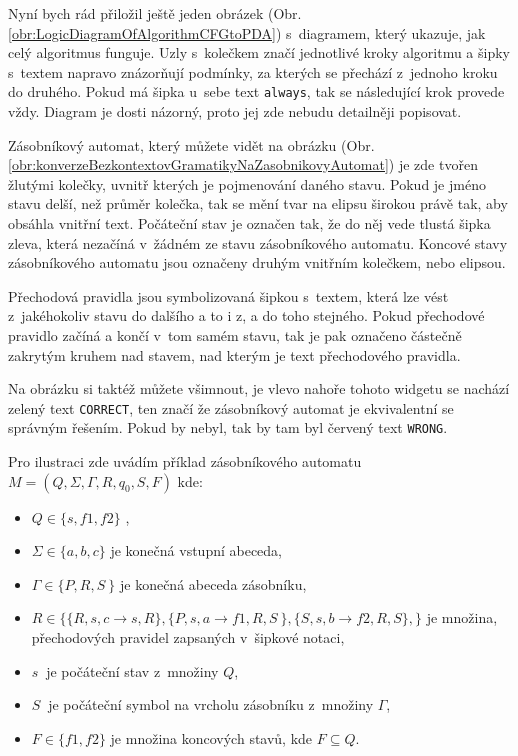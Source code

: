 Nyní bych rád přiložil ještě jeden obrázek (Obr. \ref{obr:LogicDiagramOfAlgorithmCFGtoPDA}) s~diagramem, který ukazuje, jak celý algoritmus funguje. Uzly s~kolečkem značí jednotlivé kroky algoritmu a šipky s~textem napravo znázorňují podmínky, za kterých se přechází z~jednoho kroku do druhého. Pokud má šipka u~sebe text \texttt{always}, tak se následující krok provede vždy. Diagram je dosti názorný, proto jej zde nebudu detailněji popisovat.



Zásobníkový automat, který můžete vidět na obrázku (Obr. \ref{obr:konverzeBezkontextovGramatikyNaZasobnikovyAutomat}) je zde tvořen žlutými kolečky, uvnitř kterých je pojmenování daného stavu. Pokud je jméno stavu delší, než průměr kolečka, tak se mění tvar na elipsu širokou právě tak, aby obsáhla vnitřní text. Počáteční stav je označen tak, že do něj vede tlustá šipka zleva, která nezačíná v~žádném ze stavu zásobníkového automatu. Koncové stavy zásobníkového automatu jsou označeny druhým vnitřním kolečkem, nebo elipsou.

Přechodová pravidla jsou symbolizovaná šipkou s~textem, která lze vést z~jakéhokoliv stavu do dalšího a to i z, a do toho stejného. Pokud přechodové pravidlo začíná a končí v~tom samém stavu, tak je pak označeno částečně zakrytým kruhem nad stavem, nad kterým je text přechodového pravidla. 

Na obrázku si taktéž můžete všimnout, je vlevo nahoře tohoto widgetu se nachází zelený text \texttt{CORRECT}, ten značí že zásobníkový automat je ekvivalentní se správným řešením. Pokud by nebyl, tak by tam byl červený text \texttt{WRONG}. 

Pro ilustraci zde uvádím příklad zásobníkového automatu \( M = (Q, \Sigma, \Gamma, R, q_0, S, F) \) kde:
\begin{itemize}
\item \( Q \in \{ s, f1, f2 \} \) ,
\item \( \Sigma \in \{ a, b, c \} \) je konečná vstupní abeceda,
\item \( \Gamma \in \{ P, R, S~\} \) je konečná abeceda zásobníku,
\item \( R \in \{ \{ R, s, c \rightarrow s, R \}, \{ P,s,a \rightarrow f1, R, S~\}, \{ S, s, b \rightarrow f2, R, S\}, \} \) je množina, přechodových pravidel zapsaných v~šipkové notaci,
\item \( s~\) je počáteční stav z~množiny \( Q \),
\item \( S~\) je počáteční symbol na vrcholu zásobníku z~množiny \( \Gamma \),
\item \( F \in \{ f1, f2\} \) je množina koncových stavů, kde \( F \subseteq Q \).
\end{itemize}

